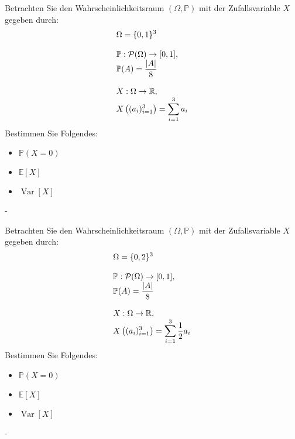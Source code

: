 \documentclass{article}
\begin{document}
\begin{problem}
Betrachten Sie den Wahrscheinlichkeitsraum $(\Omega, \mathbb{P})$ mit der Zufallsvariable $X$ gegeben durch:
\[
\begin{array}{>{\displaystyle}l}
\Omega = \{0, 1\}^3 \\
\\
\mathbb{P}: \mathcal{P}(\Omega) \to [0, 1], \\
\mathbb{P}(A) = \frac{|A|}{8} \\
\\
X: \Omega \to \mathbb{R}, \\
X \left( (a_i)_{i = 1}^3 \right) = \sum_{i = 1}^3 a_i
\end{array}
\]
Bestimmen Sie Folgendes:
\begin{itemize}
\item $\mathbb{P}(X = 0)$
\item $\mathbb{E}[X]$
\item $\operatorname{Var}[X]$
\end{itemize}
\end{problem}

\begin{solution}
-
\end{solution}

\begin{problem}
Betrachten Sie den Wahrscheinlichkeitsraum $(\Omega, \mathbb{P})$ mit der Zufallsvariable $X$ gegeben durch:
\[
\begin{array}{>{\displaystyle}l}
\Omega = \{0, 2\}^3 \\
\\
\mathbb{P}: \mathcal{P}(\Omega) \to [0, 1], \\
\mathbb{P}(A) = \frac{|A|}{8} \\
\\
X: \Omega \to \mathbb{R}, \\
X \left( (a_i)_{i = 1}^3 \right) = \sum_{i = 1}^3 \frac{1}{2} a_i
\end{array}
\]
Bestimmen Sie Folgendes:
\begin{itemize}
\item $\mathbb{P}(X = 0)$
\item $\mathbb{E}[X]$
\item $\operatorname{Var}[X]$
\end{itemize}
\end{problem}

\begin{solution}
-
\end{solution}
\end{document}
